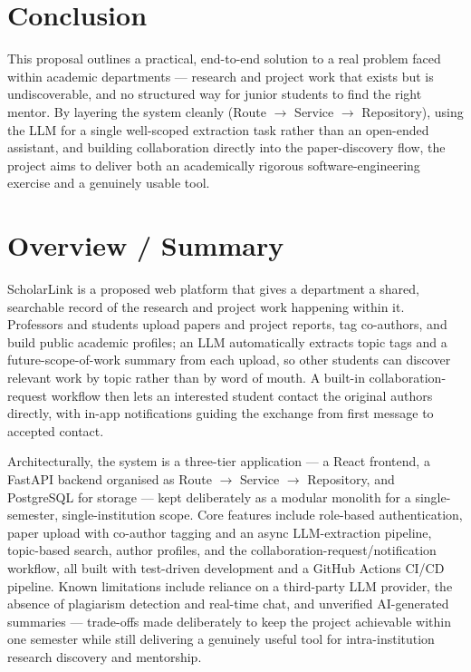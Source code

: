 \documentclass[11pt]{article}
\begin{document}
\section{Conclusion}
This proposal outlines a practical, end-to-end solution to a real problem faced within academic departments --- research and project work that exists but is undiscoverable, and no structured way for junior students to find the right mentor. By layering the system cleanly (Route $\rightarrow$ Service $\rightarrow$ Repository), using the LLM for a single well-scoped extraction task rather than an open-ended assistant, and building collaboration directly into the paper-discovery flow, the project aims to deliver both an academically rigorous software-engineering exercise and a genuinely usable tool.

\section{Overview / Summary}
ScholarLink is a proposed web platform that gives a department a shared, searchable record of the research and project work happening within it. Professors and students upload papers and project reports, tag co-authors, and build public academic profiles; an LLM automatically extracts topic tags and a future-scope-of-work summary from each upload, so other students can discover relevant work by topic rather than by word of mouth. A built-in collaboration-request workflow then lets an interested student contact the original authors directly, with in-app notifications guiding the exchange from first message to accepted contact.

Architecturally, the system is a three-tier application --- a React frontend, a FastAPI backend organised as Route $\rightarrow$ Service $\rightarrow$ Repository, and PostgreSQL for storage --- kept deliberately as a modular monolith for a single-semester, single-institution scope. Core features include role-based authentication, paper upload with co-author tagging and an async LLM-extraction pipeline, topic-based search, author profiles, and the collaboration-request/notification workflow, all built with test-driven development and a GitHub Actions CI/CD pipeline. Known limitations include reliance on a third-party LLM provider, the absence of plagiarism detection and real-time chat, and unverified AI-generated summaries --- trade-offs made deliberately to keep the project achievable within one semester while still delivering a genuinely useful tool for intra-institution research discovery and mentorship.
\end{document}
